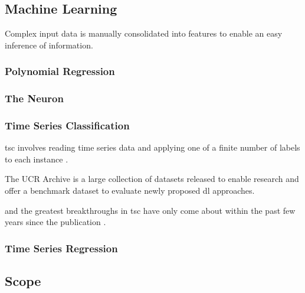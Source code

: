 \subsection{Machine Learning}
Complex input data is manually consolidated into features to enable an easy inference of information.

\subsubsection{Polynomial Regression}

\subsubsection{The Neuron}

\subsubsection{Time Series Classification}


\ac{tsc} involves reading time series data and applying one of a finite number of labels to each instance \cite{fawaz_inceptiontime_2019}. 

The UCR Archive \cite{dau_ucr_2019} is a large collection of datasets released to enable research and offer a benchmark dataset to evaluate newly proposed \ac{dl} approaches. 

 and the greatest breakthroughs in \ac{tsc} have only come about within the past few years since the publication \cite{ismail_fawaz_deep_2019, fawaz_inceptiontime_2019}.


\subsubsection{Time Series Regression}

\subsection{Scope}